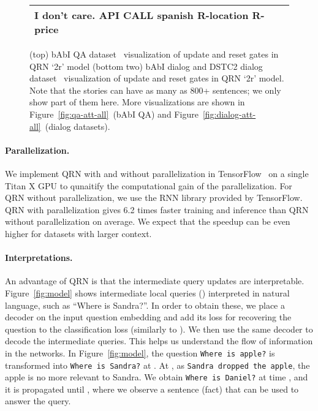 \documentclass[table]{article}
\begin{document}
\begin{figure}[t]
{\begin{tabular}{|p{6.5cm}|ccc|c|}
    \hline
    
    \multicolumn{5}{|l|}{I don't care. \hfill API CALL spanish R-location R-price}\\
    
    \hline
    \end{tabular}
    }
    
    \caption{\small (top) bAbI QA dataset~\citep{babi} visualization of update and reset gates in QRN `2r' model (bottom two) bAbI dialog and DSTC2 dialog dataset~\citep{bordes2016learning} visualization of update and reset gates in QRN `2r' model.
Note that the stories can have as many as 800+ sentences; we only show part of them here. More visualizations are shown in Figure~\ref{fig:qa-att-all}~(bAbI QA) and Figure~\ref{fig:dialog-att-all}~(dialog datasets).
    }
    \label{fig:att-summary}
\end{figure}




\paragraph{Parallelization.}
We implement QRN with and without parallelization in TensorFlow~\citep{tensorflow} on a single Titan X GPU to qunaitify the computational gain of the parallelization.
For QRN without parallelization, we use the RNN library provided by TensorFlow. 
QRN with parallelization gives 6.2 times faster training and inference than QRN without parallelization on average.
We expect that the speedup can be even higher for datasets with larger context.

\paragraph{Interpretations.}
An advantage of QRN is that the intermediate query updates are interpretable.
Figure~\ref{fig:model} shows intermediate local queries () interpreted in natural language, such as ``Where is Sandra?''.
In order to obtain these, we place a decoder on the input question embedding  and add its loss for recovering the question to the classification loss (similarly to \citet{NR}).
We then use the same decoder to decode the intermediate queries.
This helps us understand the flow of information in the networks. 
In Figure~\ref{fig:model}, the question \texttt{Where is apple?} is transformed into \texttt{Where is Sandra?} at .
At , as \texttt{Sandra dropped the apple}, the apple is no more relevant to Sandra.
We obtain \texttt{Where is Daniel?} at time , and it is propagated until , where we observe a sentence (fact) that can be used to answer the query.
\end{document}

